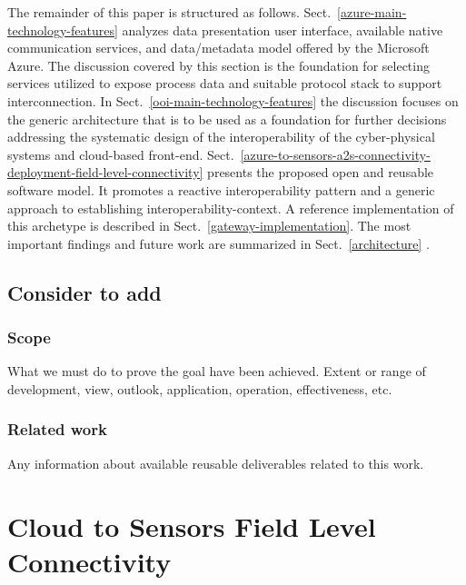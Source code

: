 \documentclass{jacsart}
\begin{document}
The remainder of this paper is structured as follows. Sect.~\ref*{azure-main-technology-features}  analyzes data presentation user interface, available native communication services, and data/metadata model offered by the Microsoft Azure. The discussion covered by this section is the foundation for selecting services utilized to expose process data and suitable protocol stack to support interconnection. In Sect.~\ref*{ooi-main-technology-features} the discussion focuses on the generic architecture that is to be used as a foundation for further decisions addressing the systematic design of the interoperability of the cyber-physical systems and cloud-based front-end. Sect.~\ref*{azure-to-sensors-a2s-connectivity-deployment-field-level-connectivity} presents the proposed open and reusable software model. It promotes a reactive interoperability pattern and a generic approach to establishing interoperability-context. A reference implementation of this archetype is described in Sect.~\ref*{gateway-implementation}. The most important findings and future work are summarized in Sect.~\ref*{architecture} .

\hypertarget{consider-to-add}{%
\subsection{Consider to add}\label{consider-to-add}}

\hypertarget{scope}{%
\subsubsection{Scope}\label{scope}}

What we must do to prove the goal have been achieved. Extent or range of
development, view, outlook, application, operation, effectiveness, etc.

\hypertarget{related-work}{%
\subsubsection{Related work}\label{related-work}}

Any information about available reusable deliverables related to this
work.

\hypertarget{cloud-to-sensors-field-level-connectivity}{%
\section{Cloud to Sensors Field Level Connectivity}\label{cloud-to-sensors-field-level-connectivity}}
\end{document}
